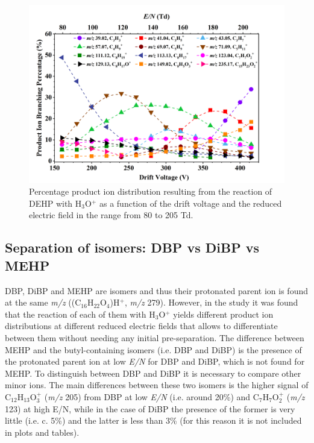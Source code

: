 \begin{figure}[htb]%
\centering
\includegraphics[height=0.4\textheight]{pics/DEHP-BR.png}
\caption{Percentage product ion distribution  resulting from the reaction of DEHP with H$_3$O$^+$ as a function of the drift voltage and the reduced electric field in the range from 80 to 205 Td.}
\label{fig:PH_DEHP_fs}
\end{figure}







\subsection{Separation of isomers: DBP vs DiBP vs MEHP }
DBP, DiBP and MEHP are isomers and thus their protonated parent ion is found at the same \textit{m/z} ((C$_{16}$H$_{22}$O$_4$)H$^+$, \textit{m/z} 279).
%
However, in the study it was found that the reaction of each of them with H$_3$O$^+$ yields different product ion distributions at different reduced electric fields that allows to differentiate between them without needing any initial pre-separation.
%
The difference between MEHP and the butyl-containing isomers (i.e. DBP and DiBP)  is the presence of the protonated parent ion at low \textit{E/N} for DBP and DiBP, which is not found for MEHP.
To distinguish between DBP and DiBP it is necessary to compare other minor ions.
%
The main differences between these two isomers is the higher signal of C$_{12}$H$_{13}$O$_3^+$ (\textit{m/z} 205) from DBP at low \textit{E/N} (i.e. around 20\%) and C$_{7}$H$_{7}$O$_2^+$ (\textit{m/z} 123) at high E/N, while in the case of DiBP the presence of the former is very little (i.e. c. 5\%) and the latter is less than 3\% (for this reason it is not included in plots and tables). 















